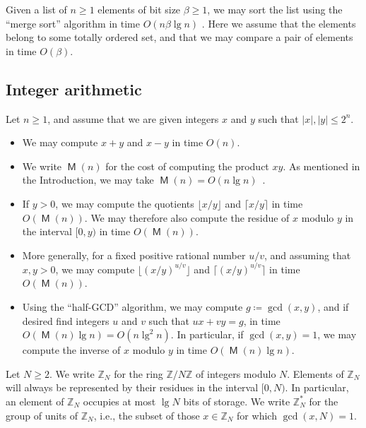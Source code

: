 \documentclass[reqno]{amsart}
\theoremstyle{remark}
\numberwithin{equation}{section}
\numberwithin{thm}{section}
\newcommand{\ZZ}{\mathbb{Z}}
\DeclareMathOperator{\MM}{\mathsf{M}}
\renewcommand{\leq}{\leqslant}
\renewcommand{\geq}{\geqslant}
\newcommand{\defeq}{\coloneqq}
\begin{document}
Given a list of $n \geq 1$ elements of bit size $\beta \geq 1$,
we may sort the list using the ``merge sort'' algorithm
in time $O(n \beta \lg n)$ \cite{Knu-TAOCP3}.
Here we assume that the elements belong to some totally ordered set,
and that we may compare a pair of elements in time $O(\beta)$.

\subsection{Integer arithmetic}

Let $n \geq 1$, and assume that we are given integers $x$ and $y$ such that
$|x|, |y| \leq 2^n$.
\begin{itemize}
  \item
  We may compute $x + y$ and $x - y$ in time $O(n)$.

  \item
  We write $\MM(n)$ for the cost of computing the product $xy$.
  As mentioned in the Introduction, we may take
  $\MM(n) = O(n \lg n)$~\cite{HvdH-nlogn}.

  \item 
  If $y > 0$, we may compute the quotients $\lfloor x/y \rfloor$ and
  $\lceil x/y \rceil$ in time $O(\MM(n))$.
  We may therefore also compute the residue of $x$ modulo $y$
  in the interval $[0, y)$ in time $O(\MM(n))$.
  
  \item
  More generally, for a fixed positive rational number $u/v$,
  and assuming that $x, y > 0$, we may compute
  $\lfloor (x/y)^{u/v} \rfloor$ and $\lceil (x/y)^{u/v} \rceil$
  in time $O(\MM(n))$.
  
  \item
  Using the ``half-GCD'' algorithm,
  we may compute $g \defeq \gcd(x, y)$,
  and if desired find integers $u$ and $v$ such that $ux + vy = g$,
  in time $O(\MM(n) \lg n) = O(n \lg^2 n)$.
  In particular, if $\gcd(x, y) = 1$,
  we may compute the inverse of $x$ modulo $y$
  in time $O(\MM(n) \lg n)$.
\end{itemize}

Let $N \geq 2$.
We write $\ZZ_N$ for the ring $\ZZ/N\ZZ$ of integers modulo $N$.
Elements of $\ZZ_N$ will always be represented by their residues in the
interval $[0, N)$.
In particular, an element of $\ZZ_N$ occupies at most $\lg N$ bits of storage.
We write $\ZZ_N^*$ for the group of units of $\ZZ_N$,
i.e., the subset of those $x \in \ZZ_N$ for which $\gcd(x, N) = 1$.
\end{document}
